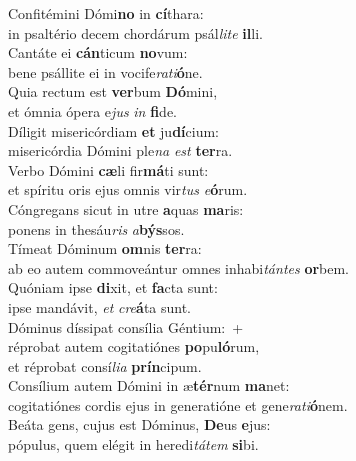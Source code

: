 \evenverse Confitémini Dómi\textbf{no} in \textbf{cí}thara:~\*\\
\evenverse in psaltério decem chordárum psál\textit{li}\textit{te} \textbf{il}li.\\
\oddverse Cantáte ei \textbf{cán}ticum \textbf{no}vum:~\*\\
\oddverse bene psállite ei in vocife\textit{ra}\textit{ti}\textbf{ó}ne.\\
\evenverse Quia rectum est \textbf{ver}bum \textbf{Dó}mini,~\*\\
\evenverse et ómnia ópera e\textit{jus} \textit{in} \textbf{fi}de.\\
\oddverse Díligit misericórdiam \textbf{et} ju\textbf{dí}cium:~\*\\
\oddverse misericórdia Dómini ple\textit{na} \textit{est} \textbf{ter}ra.\\
\evenverse Verbo Dómini \textbf{cæ}li fir\textbf{má}ti sunt:~\*\\
\evenverse et spíritu oris ejus omnis vir\textit{tus} \textit{e}\textbf{ó}rum.\\
\oddverse Cóngregans sicut in utre \textbf{a}quas \textbf{ma}ris:~\*\\
\oddverse ponens in thesáu\textit{ris} \textit{a}\textbf{býs}sos.\\
\evenverse Tímeat Dóminum \textbf{om}nis \textbf{ter}ra:~\*\\
\evenverse ab eo autem commoveántur omnes inhabi\textit{tán}\textit{tes} \textbf{or}bem.\\
\oddverse Quóniam ipse \textbf{di}xit, et \textbf{fa}cta sunt:~\*\\
\oddverse ipse mandávit, \textit{et} \textit{cre}\textbf{á}ta sunt.\\
\evenverse Dóminus díssipat consília Géntium:~+\\
\evenverse  réprobat autem cogitatiónes \textbf{po}pu\textbf{ló}rum,~\*\\
\evenverse et réprobat consí\textit{li}\textit{a} \textbf{prín}cipum.\\
\oddverse Consílium autem Dómini in æ\textbf{tér}num \textbf{ma}net:~\*\\
\oddverse cogitatiónes cordis ejus in generatióne et gene\textit{ra}\textit{ti}\textbf{ó}nem.\\
\evenverse Beáta gens, cujus est Dóminus, \textbf{De}us \textbf{e}jus:~\*\\
\evenverse pópulus, quem elégit in heredi\textit{tá}\textit{tem} \textbf{si}bi.\\
